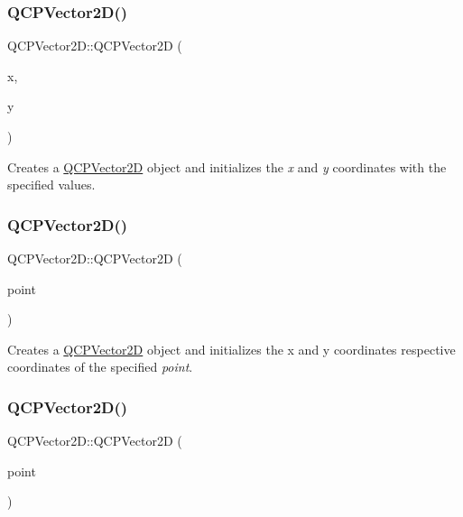 \subsubsection{\texorpdfstring{Q\+C\+P\+Vector2\+D()}{QCPVector2D()}\hspace{0.1cm}{\footnotesize\ttfamily [2/4]}}
{\footnotesize\ttfamily Q\+C\+P\+Vector2\+D\+::\+Q\+C\+P\+Vector2D (\begin{DoxyParamCaption}\item[{double}]{x,  }\item[{double}]{y }\end{DoxyParamCaption})}

Creates a \mbox{\hyperlink{class_q_c_p_vector2_d}{Q\+C\+P\+Vector2D}} object and initializes the {\itshape x} and {\itshape y} coordinates with the specified values. \mbox{\label{class_q_c_p_vector2_d_ad8f30a064dc37c90a7ba5e6732ceb5bb}} 
\subsubsection{\texorpdfstring{Q\+C\+P\+Vector2\+D()}{QCPVector2D()}\hspace{0.1cm}{\footnotesize\ttfamily [3/4]}}
{\footnotesize\ttfamily Q\+C\+P\+Vector2\+D\+::\+Q\+C\+P\+Vector2D (\begin{DoxyParamCaption}\item[{const Q\+Point \&}]{point }\end{DoxyParamCaption})}

Creates a \mbox{\hyperlink{class_q_c_p_vector2_d}{Q\+C\+P\+Vector2D}} object and initializes the x and y coordinates respective coordinates of the specified {\itshape point}. \mbox{\label{class_q_c_p_vector2_d_a3c16eba1006c210ffc3299253fef2339}} 
\subsubsection{\texorpdfstring{Q\+C\+P\+Vector2\+D()}{QCPVector2D()}\hspace{0.1cm}{\footnotesize\ttfamily [4/4]}}
{\footnotesize\ttfamily Q\+C\+P\+Vector2\+D\+::\+Q\+C\+P\+Vector2D (\begin{DoxyParamCaption}\item[{const Q\+PointF \&}]{point }\end{DoxyParamCaption})}

